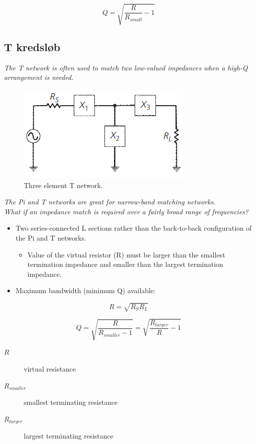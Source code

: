 \begin{equation}
Q = \sqrt{\dfrac{R}{R_{small}}-1}
\end{equation}


\subsection{T kredsløb}
\textit{The T network is often used to match two low-valued impedances when a high-Q arrangement is needed.}

\begin{figure} [H]
	\centering
	\includegraphics[width=0.6\linewidth]{graphics/28.png}
	\caption{Three element T network.}
	\label{fig:28}
\end{figure}

\noindent\textit{The Pi and T networks are great for narrow-band matching networks.\\
What if an impedance match is required over a fairly broad range of frequencies?}

\begin{itemize}
	\item Two series-connected L sections rather than the back-to-back configuration
	of the Pi and T networks.
	\begin{itemize}
		\item Value of the virtual resistor (R) must be larger than the smallest termination impedance and smaller than the largest termination
		impedance.
	\end{itemize}
	\item Maximum bandwidth (minimum Q) available:
\end{itemize}

\begin{equation}
R = \sqrt{R_S R_L}
\end{equation}

\begin{equation}
Q = \sqrt{\dfrac{R}{R_{smaller}-1}}= \sqrt{\dfrac{R_{larger}}{R}-1}
\end{equation}

\begin{description}
	\item[$R$] virtual resistance
	\item[$R_{smaller}$] smallest terminating resistance
	\item[$R_{larger}$] largest terminating resistance
\end{description}

